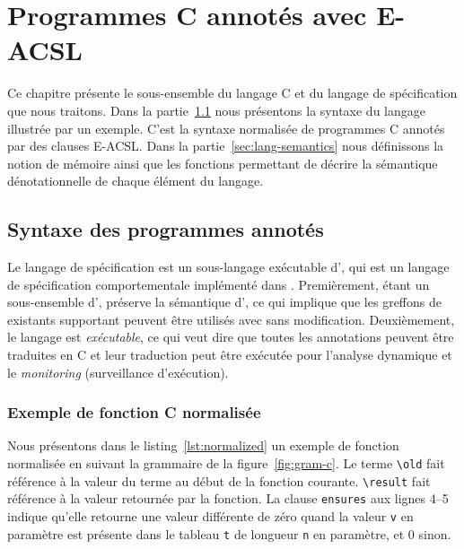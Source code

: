 
\chapter{Programmes C annotés avec E-ACSL}
\label{sec:lang}

\chapterintro


Ce chapitre présente le sous-ensemble du langage C et du langage de
spécification \eacsl que nous traitons.
Dans la partie~\ref{sec:lang-syntax} nous présentons la syntaxe du langage
illustrée par un exemple.
C'est la syntaxe normalisée de programmes C annotés par des clauses E-ACSL.
Dans la partie~\ref{sec:lang-semantics} nous définissons la notion de mémoire
ainsi que les fonctions permettant de décrire la sémantique dénotationnelle de
chaque élément du langage.


\section{Syntaxe des programmes annotés}
\label{sec:lang-syntax}


Le langage de spécification \eacsl est un sous-langage exécutable d'\acsl, qui
est un langage de spécification comportementale implémenté dans \framac.
Premièrement, étant un sous-ensemble d'\acsl, \eacsl préserve la sémantique
d'\acsl, ce qui implique que les greffons de \framac existants supportant \acsl
peuvent être utilisés avec \eacsl sans modification.
Deuxièmement, le langage \eacsl est \textit{exécutable}, ce qui veut dire que
toutes les annotations peuvent être traduites en C et leur traduction peut être
exécutée pour l'analyse dynamique et le \textit{monitoring} (surveillance
d'exécution).


\subsection{Exemple de fonction C normalisée}
\label{sec:translation-example}


Nous présentons dans le listing~\ref{lst:normalized} un exemple de fonction
normalisée en suivant la grammaire de la figure~\ref{fig:gram-c}.
Le terme \lstinline'\old' fait référence à la valeur du terme au début de la
fonction courante.
\lstinline{\result} fait référence à la valeur retournée par la fonction.
La clause \lstinline'ensures' aux lignes 4--5 indique qu'elle retourne une
valeur différente de zéro quand la valeur \lstinline'v' en paramètre est
présente dans le tableau \lstinline't' de longueur \lstinline'n' en paramètre,
et $0$ sinon.

